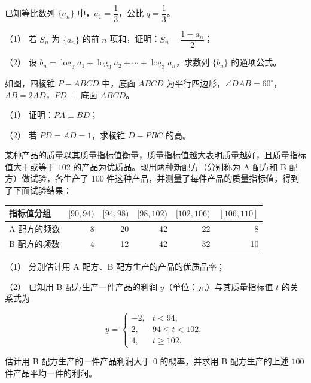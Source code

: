 \begin{question}
已知等比数列 $\{a_n\}$ 中，$a_1=\dfrac13$，公比 $q=\dfrac13$。

（1） 若 $S_n$ 为 $\{a_n\}$ 的前 $n$ 项和，证明：$S_n=\dfrac{1-a_n}{2}$；

（2） 设 $b_n=\log_3a_1+\log_3a_2+\cdots+\log_3a_n$，求数列 $\{b_n\}$ 的通项公式。

\Needspace{0.4\textheight}
\end{question}
\begin{question}
如图，四棱锥 $P-ABCD$ 中，底面 $ABCD$ 为平行四边形，$\angle DAB=60^\circ$，$AB=2AD$，$PD\perp$ 底面 $ABCD$。
\nopagebreak[4]
\begin{center}\end{center}
\nopagebreak[4]
（1） 证明：$PA\perp BD$；

（2） 若 $PD=AD=1$，求棱锥 $D-PBC$ 的高。

\end{question}
\begin{question}
某种产品的质量以其质量指标值衡量，质量指标值越大表明质量越好，且质量指标值大于或等于 $102$ 的产品为优质品。现用两种新配方（分别称为 A 配方和 B 配方）做试验，各生产了 $100$ 件这种产品，并测量了每件产品的质量指标值，得到了下面试验结果：

\begin{center}
\begin{tabular}{lrrrrr}
\toprule
指标值分组 & $[90,94)$ & $[94,98)$ & $[98,102)$ & $[102,106)$ & $[106,110]$ \\
\midrule
A 配方的频数 & 8 & 20 & 42 & 22 & 8 \\
B 配方的频数 & 4 & 12 & 42 & 32 & 10 \\
\bottomrule
\end{tabular}
\end{center}

（1） 分别估计用 A 配方、B 配方生产的产品的优质品率；

（2） 已知用 B 配方生产一件产品的利润 $y$（单位：元）与其质量指标值 $t$ 的关系式为

\nopagebreak[4]
\[
y=\begin{cases}
-2,&t<94,\\
2,&94\leq t<102,\\
4,&t\geq102.
\end{cases}
\]

估计用 B 配方生产的一件产品利润大于 $0$ 的概率，并求用 B 配方生产的上述 $100$ 件产品平均一件的利润。

\end{question}

